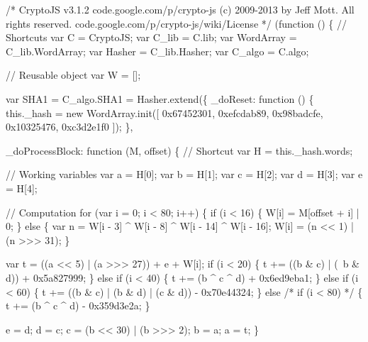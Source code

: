 \begin{DoxyCodeInclude}
\textcolor{comment}{/*}
\textcolor{comment}{CryptoJS v3.1.2}
\textcolor{comment}{code.google.com/p/crypto-js}
\textcolor{comment}{(c) 2009-2013 by Jeff Mott. All rights reserved.}
\textcolor{comment}{code.google.com/p/crypto-js/wiki/License}
\textcolor{comment}{*/}
(\textcolor{keyword}{function} () \{
    \textcolor{comment}{// Shortcuts}
    var C = CryptoJS;
    var C\_lib = C.lib;
    var WordArray = C\_lib.WordArray;
    var Hasher = C\_lib.Hasher;
    var C\_algo = C.algo;

    \textcolor{comment}{// Reusable object}
    var W = [];

    var SHA1 = C\_algo.SHA1 = Hasher.extend(\{
        \_doReset: \textcolor{keyword}{function} () \{
            this.\_hash = \textcolor{keyword}{new} WordArray.init([
                0x67452301, 0xefcdab89,
                0x98badcfe, 0x10325476,
                0xc3d2e1f0
            ]);
        \},

        \_doProcessBlock: \textcolor{keyword}{function} (M, offset) \{
            \textcolor{comment}{// Shortcut}
            var H = this.\_hash.words;

            \textcolor{comment}{// Working variables}
            var a = H[0];
            var b = H[1];
            var c = H[2];
            var d = H[3];
            var e = H[4];

            \textcolor{comment}{// Computation}
            \textcolor{keywordflow}{for} (var i = 0; i < 80; i++) \{
                \textcolor{keywordflow}{if} (i < 16) \{
                    W[i] = M[offset + i] | 0;
                \} \textcolor{keywordflow}{else} \{
                    var n = W[i - 3] ^ W[i - 8] ^ W[i - 14] ^ W[i - 16];
                    W[i] = (n << 1) | (n >>> 31);
                \}

                var t = ((a << 5) | (a >>> 27)) + e + W[i];
                \textcolor{keywordflow}{if} (i < 20) \{
                    t += ((b & c) | (~b & d)) + 0x5a827999;
                \} \textcolor{keywordflow}{else} \textcolor{keywordflow}{if} (i < 40) \{
                    t += (b ^ c ^ d) + 0x6ed9eba1;
                \} \textcolor{keywordflow}{else} \textcolor{keywordflow}{if} (i < 60) \{
                    t += ((b & c) | (b & d) | (c & d)) - 0x70e44324;
                \} \textcolor{keywordflow}{else} \textcolor{comment}{/* if (i < 80) */} \{
                    t += (b ^ c ^ d) - 0x359d3e2a;
                \}

                e = d;
                d = c;
                c = (b << 30) | (b >>> 2);
                b = a;
                a = t;
            \}


\end{DoxyCodeInclude}

